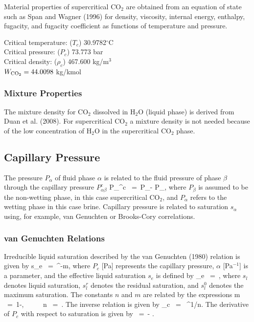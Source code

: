 \documentclass[12pt]{article}
\def\EQ#1\EN{\begin{equation}#1\end{equation}}
\newcommand{\eq}{\ =\ }
\newcommand{\degc}{$^\circ$C}
\renewcommand{\c}{{\rm CO_2}}
\renewcommand{\a}{{\alpha}}
\renewcommand{\b}{{\beta}}
\begin{document}
Material properties of supercritical CO$_2$ are obtained from an equation of state such as Span and Wagner (1996) for density, viscosity, internal energy, enthalpy, fugacity, and fugacity coefficient as functions of temperature and pressure.

\noindent
Critical temperature: ($T_c$) 30.9782\degc\\
Critical pressure: ($P_c$)	73.773 bar\\
Critical density: ($\rho_c$) 467.600 kg/m$^3$\\
$W_{\c} = 44.0098$ kg/kmol

\subsubsection{Mixture Properties}

The mixture density for CO$_2$ dissolved in H$_2$O (liquid phase) is derived from Duan et al. (2008). For supercritical CO$_2$ a mixture density is not needed because of the low concentration of H$_2$O in the supercritical CO$_2$ phase.

\subsection{Capillary Pressure}

The pressure $P_\a$ of fluid phase $\a$ is related to the fluid pressure of phase $\b$ through the capillary pressure $P_{\a\b}^c$
\EQ\label{pc}
P_{\a\b}^c \eq P_\b - P_\a,
\EN
where $P_\b$ is assumed to be the non-wetting phase, in this case supercritical CO$_2$, and $P_\a$ refers to the wetting phase in this case brine. Capillary pressure is related to saturation $s_\a$ using, for example, van Genuchten or Brooks-Cory correlations.

\subsubsection{van Genuchten Relations}

Irreducible liquid saturation described by the van Genuchten (1980) relation is given by
\EQ\label{seff}
s_e \eq {}^{-m}, 
\EN 
where $P_c$ [Pa] represents the capillary pressure, $\a$ [Pa$^{-1}$] is a parameter, and the effective liquid saturation $s_e$ is defined by 
\EQ 
s_e \eq {}, 
\EN 
where $s_l^{}$ denotes liquid saturation, $s_l^r$ denotes the residual saturation, and $s_l^0$ denotes the maximum saturation. The constants $n$ and $m$ are related by the expressions 
\EQ\label{lambda} 
m \eq 1-, \ \ \ \ \ n \eq {}. 
\EN 
The inverse relation is given by
\EQ
P_c \eq {} ^{1/n}.
\EN
The derivative of $P_c$ with respect to saturation is given by
\EQ
\frac{dP_c}{ds_e} \eq - .
\EN
\end{document}
